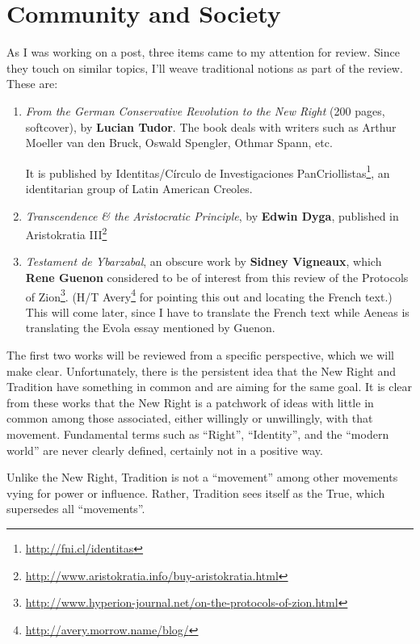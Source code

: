 \section{Community and Society}

As I was working on a post, three items came to my attention for review. Since they touch on similar topics, I'll weave traditional notions as part of the review. These are:

\begin{enumerate}


\item \emph{From the German Conservative Revolution to the New Right} (200 pages, softcover), by \textbf{Lucian Tudor}. The book deals with writers such as Arthur Moeller van den Bruck, Oswald Spengler, Othmar Spann, etc.

It is published by Identitas/Círculo de Investigaciones PanCriollistas\footnote{\url{http://fni.cl/identitas}}, an identitarian group of Latin American Creoles.

\item \emph{Transcendence \& the Aristocratic Principle}, by \textbf{Edwin Dyga}, published in Aristokratia III\footnote{\url{http://www.aristokratia.info/buy-aristokratia.html}}

\item \emph{Testament de Ybarzabal}, an obscure work by \textbf{Sidney Vigneaux}, which \textbf{Rene Guenon} considered to be of interest from this review of the Protocols of Zion\footnote{\url{http://www.hyperion-journal.net/on-the-protocols-of-zion.html}}. (H/T Avery\footnote{\url{http://avery.morrow.name/blog/}} for pointing this out and locating the French text.) This will come later, since I have to translate the French text while Aeneas is translating the Evola essay mentioned by Guenon.
\end{enumerate}


The first two works will be reviewed from a specific perspective, which we will make clear. Unfortunately, there is the persistent idea that the New Right and Tradition have something in common and are aiming for the same goal. It is clear from these works that the New Right is a patchwork of ideas with little in common among those associated, either willingly or unwillingly, with that movement. Fundamental terms such as ``Right'', ``Identity'', and the ``modern world'' are never clearly defined, certainly not in a positive way.

Unlike the New Right, Tradition is not a ``movement'' among other movements vying for power or influence. Rather, Tradition sees itself as the True, which supersedes all ``movements''.

